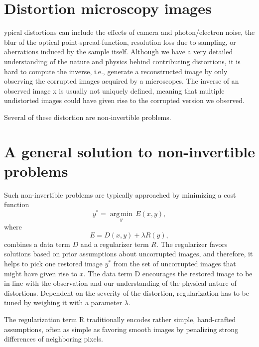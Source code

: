 \section{Distortion microscopy images}
ypical distortions can include the effects of camera and
photon/electron noise, the blur of the optical point-spread-function,
resolution loss due to sampling, or aberrations induced by the sample
itself. Although we have a very detailed understanding of the nature
and physics behind contributing distortions, it is hard to compute the
inverse, i.e., generate a reconstructed image by only observing the
corrupted images acquired by a microscopes. The inverse of an observed
image x is usually not uniquely defined, meaning that multiple
undistorted images could have given rise to the corrupted version we
observed. %

Several of these distortion are non-invertible problems.

\section{A general solution to non-invertible problems}
Such non-invertible problems are typically approached by minimizing a
cost function
\begin{equation}
y^*=\underset{y}{\operatorname{arg\,min}} \, E(x,y),
\end{equation}
where
\begin{equation}
E = D(x,y) + \lambda R(y),
\end{equation}
combines a data term $D$ and a regularizer term $R$. The regularizer
favors solutions based on prior assumptions about uncorrupted images,
and therefore, it helps to pick one restored image $y^*$ from the set
of uncorrupted images that might have given rise to $x$. The data term
D encourages the restored image to be in-line with the observation and
our understanding of the physical nature of distortions. Dependent on
the severity of the distortion, regularization has to be tuned by
weighing it with a parameter $\lambda$. %

The regularization term R traditionally encodes rather simple,
hand-crafted assumptions, often as simple as favoring smooth images by
penalizing strong differences of neighboring pixels.  %

